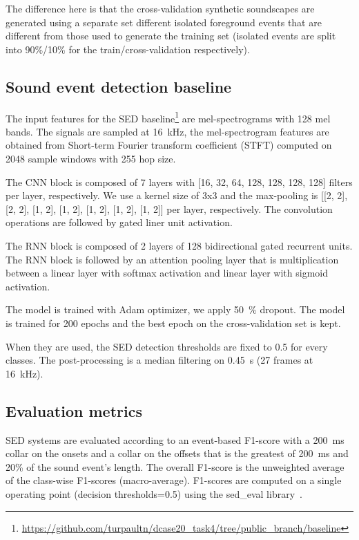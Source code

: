 \documentclass{article}
\begin{document}
\begin{sloppy}
The difference here is that the cross-validation synthetic soundscapes are generated using a separate set different isolated foreground events that are different from those used to generate the training set (isolated events are split into 90\%/10\% for the train/cross-validation respectively).

\subsection{Sound event detection baseline}
The input features for the SED baseline\footnote{ \url{https://github.com/turpaultn/dcase20_task4/tree/public_branch/baseline}} are mel-spectrograms with 128 mel bands. The signals are sampled at 16~kHz, the mel-spectrogram features are obtained from Short-term Fourier transform coefficient (STFT) computed on 2048 sample windows with 255 hop size.

The CNN block is composed of 7 layers with [16,  32,  64,  128,  128, 128, 128] filters per layer, respectively. We use a kernel size of 3x3 and the max-pooling is [[2, 2], [2, 2], [1, 2], [1, 2], [1, 2], [1, 2], [1, 2]] per layer, respectively. The convolution operations are followed by gated liner unit activation.

The RNN block is composed of 2 layers of 128 bidirectional gated recurrent units. The RNN block is followed by an attention pooling layer that is multiplication between a linear layer with softmax activation and linear layer with sigmoid activation.

The model is trained with Adam optimizer, we apply 50~\% dropout. The model is trained for 200 epochs and the best epoch on the cross-validation set is kept.

When they are used, the SED detection thresholds are fixed to 0.5 for every classes. The post-processing is a median filtering on 0.45~s (27 frames at 16~kHz).


\subsection{Evaluation metrics}



SED systems are evaluated according to an event-based F1-score with a 200~ms collar on the onsets and a collar on the offsets that is the greatest of 200~ms and 20\% of the sound event's length. The overall F1-score is the unweighted average of the class-wise F1-scores (macro-average). F1-scores are computed on a single operating point (decision thresholds=0.5) using the sed\_eval library~\cite{mesaros_metrics_2016}.



\end{sloppy}
\end{document}

